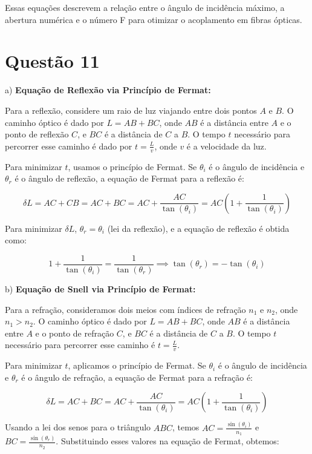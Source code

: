 \documentclass[a4paper, 12pt]{article}
\begin{document}
Essas equações descrevem a relação entre o ângulo de incidência máximo, a abertura numérica e o número F para otimizar o acoplamento em fibras ópticas.


\section*{Questão 11}

a) \textbf{Equação de Reflexão via Princípio de Fermat:}

Para a reflexão, considere um raio de luz viajando entre dois pontos \(A\) e \(B\). O caminho óptico é dado por \(L = AB + BC\), onde \(AB\) é a distância entre \(A\) e o ponto de reflexão \(C\), e \(BC\) é a distância de \(C\) a \(B\). O tempo \(t\) necessário para percorrer esse caminho é dado por \(t = \frac{L}{v}\), onde \(v\) é a velocidade da luz. 

Para minimizar \(t\), usamos o princípio de Fermat. Se \(\theta_i\) é o ângulo de incidência e \(\theta_r\) é o ângulo de reflexão, a equação de Fermat para a reflexão é:

\[
\delta L = AC + CB = AC + BC = AC + \frac{AC}{\tan(\theta_i)} = AC \left(1 + \frac{1}{\tan(\theta_i)}\right)
\]

Para minimizar \(\delta L\), \(\theta_r = \theta_i\) (lei da reflexão), e a equação de reflexão é obtida como:

\[
1 + \frac{1}{\tan(\theta_i)} = \frac{1}{\tan(\theta_r)} \implies \tan(\theta_r) = -\tan(\theta_i)
\]

b) \textbf{Equação de Snell via Princípio de Fermat:}

Para a refração, consideramos dois meios com índices de refração \(n_1\) e \(n_2\), onde \(n_1 > n_2\). O caminho óptico é dado por \(L = AB + BC\), onde \(AB\) é a distância entre \(A\) e o ponto de refração \(C\), e \(BC\) é a distância de \(C\) a \(B\). O tempo \(t\) necessário para percorrer esse caminho é \(t = \frac{L}{v}\).

Para minimizar \(t\), aplicamos o princípio de Fermat. Se \(\theta_i\) é o ângulo de incidência e \(\theta_r\) é o ângulo de refração, a equação de Fermat para a refração é:

\[
\delta L = AC + BC = AC + \frac{AC}{\tan(\theta_i)} = AC \left(1 + \frac{1}{\tan(\theta_i)}\right)
\]

Usando a lei dos senos para o triângulo \(ABC\), temos \(AC = \frac{\sin(\theta_i)}{n_1}\) e \(BC = \frac{\sin(\theta_r)}{n_2}\). Substituindo esses valores na equação de Fermat, obtemos:
\end{document}
